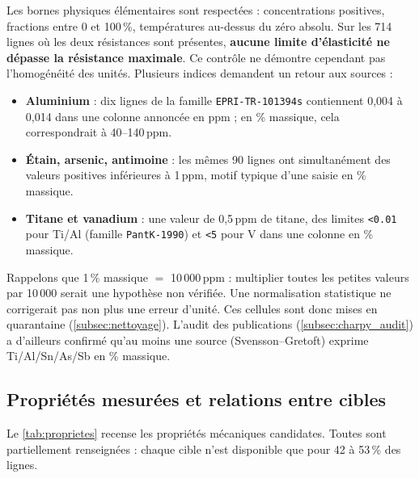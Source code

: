 Les bornes physiques élémentaires sont respectées : concentrations positives,
fractions entre 0 et 100\,\%, températures au-dessus du zéro absolu. Sur les
714 lignes où les deux résistances sont présentes, \textbf{aucune limite
d'élasticité ne dépasse la résistance maximale}. Ce contrôle ne démontre
cependant pas l'homogénéité des unités. Plusieurs indices demandent un retour aux
sources :
\begin{itemize}
  \item \textbf{Aluminium} : dix lignes de la famille \texttt{EPRI-TR-101394s} contiennent 0,004 à 0,014 dans une colonne annoncée en ppm ; en \% massique, cela correspondrait à 40--140\,ppm.
  \item \textbf{Étain, arsenic, antimoine} : les mêmes 90 lignes ont simultanément des valeurs positives inférieures à 1\,ppm, motif typique d'une saisie en \% massique.
  \item \textbf{Titane et vanadium} : une valeur de 0,5\,ppm de titane, des limites \texttt{<0.01} pour Ti/Al (famille \texttt{PantK-1990}) et \texttt{<5} pour V dans une colonne en \% massique.
\end{itemize}
Rappelons que 1\,\% massique $=$ 10\,000\,ppm : multiplier toutes les petites
valeurs par 10\,000 serait une hypothèse non vérifiée. Une normalisation
statistique ne corrigerait pas non plus une erreur d'unité. Ces cellules sont donc
mises en quarantaine (\cref{subsec:nettoyage}). L'audit des publications
(\cref{subsec:charpy_audit}) a d'ailleurs confirmé qu'au moins une source
(Svensson--Gretoft) exprime Ti/Al/Sn/As/Sb en \% massique.

\subsection{Propriétés mesurées et relations entre cibles}
\label{subsec:eda_cibles}

Le \cref{tab:proprietes} recense les propriétés mécaniques candidates. Toutes
sont partiellement renseignées : chaque cible n'est disponible que pour 42 à
53\,\% des lignes.

